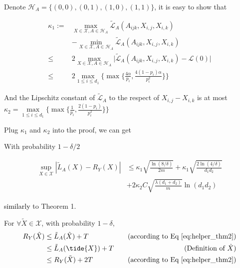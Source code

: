 \documentclass{article}
\numberwithin{equation}{section}
\newcommand{\laks}[1]{\textcolor{black}{#1}}
\newtheorem{sampling strategy}{Sampling Strategy}
\begin{document}
Denote $\mathcal{H}_A = \big\{ (0,0), (0,1), (1,0), (1,1) \big\}$, it is easy to show that 

\begin{align}
    \kappa_1 := & \max_{X \in \mathcal{X}, A \in \mathcal{H}_A}{ \tilde{\mathcal{L}}_A(A_{ijk}, X_{i,j}, X_{i,k}) } \nonumber \\
        & - \min_{X \in \mathcal{X}, A\in \mathcal{H}_A}{ \tilde{\mathcal{L}}_A(A_{ijk}, X_{i,j}, X_{i,k}) } \nonumber \\ 
    \leq & 2 \max_{X \in \mathcal{X}, A\in \mathcal{H}_A} \big| \tilde{\mathcal{L}}_A(A_{ijk}, X_{i,j}, X_{i,k}) - \mathcal{L}(0) \big| \\
    \leq & 2 \underset{1\leq i \leq d_1}{\max} \bigg\{ \max \Big\{ \frac{4\alpha}{p_{i}}, \frac{4(1-p_i)\alpha}{p_i^2} \Big\} \bigg\} \nonumber
\end{align}


And the Lipschitz constant of $\tilde{\mathcal{L}}_A$ to the respect of $X_{i,j} - X_{i,k}$ is at most $\kappa_2 = \underset{1\leq i\leq d_1}{\max}\{ \max\{\frac{1}{p_i}, \frac{2(1 - p_i)}{p_i^2}\} \}$

Plug $\kappa_1$ and $\kappa_2$ into the proof, we can get

With probability $1 - \delta/2$

\begin{equation}
    \begin{aligned}
    \sup_{X \in \mathcal{X} } |\tilde{L}_A(X) - R_Y(X)| & \leq \kappa_1 \sqrt{\frac{\ln(8/\delta)}{2m}} + \kappa_1 \sqrt{ \frac{2\ln(4/\delta) }{d_1 d_2} } \\
        & + 2 \kappa_2 C \sqrt{\frac{\lambda(d_1 + d_2)}{m}} \ln(d_1 d_2) \label{eq:helper_thm2}
    \end{aligned}
\end{equation}

\laks{similarly} to Theorem 1. %

For $\forall \tilde{X} \in \mathcal{X}$, with probability $1 - \delta$,
\begin{equation}
    \begin{aligned}
        R_Y(\hat{X}) & \leq \tilde{L}_A(\hat{X}) + T &~~~\text{(according to Eq \ref{eq:helper_thm2})} \\
        & \leq \tilde{L}_A(\tide{X}) + T &\text{(Definition of $\hat{X}$)} \\
        & \leq R_Y(\tilde{X}) + 2T  &\text{(according to Eq \ref{eq:helper_thm2})} \nonumber    
    \end{aligned}
\end{equation}
\end{document}
